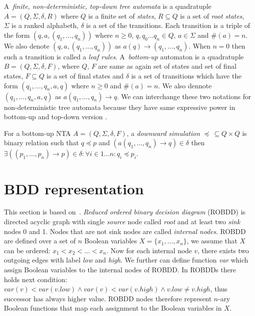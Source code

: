 \documentclass[a4paper, 12pt]{article}
\begin{document}
A~\emph{finite, non-deterministic, top-down tree automata} is a quadratuple $A=(Q, \Sigma, \delta, R)$ where
$Q$ is a finite set of \emph{states}, $R\subseteq Q$ is a set of \emph{root states}, $\Sigma$ is a ranked alphabeth,
$\delta$ is a set of the transitions.
Each transition is a triple of the form $(q,a,(q_1, \ldots, q_n))$ where $n \geq 0$, $q, q_0 \ldots q_n \in Q$, $a \in \Sigma$ and $\#(a) = n$.
We also denote $(q,a,(q_1, \ldots, q_n))$ as $a(q) \rightarrow (q_1, \ldots, q_n)$.
When $n = 0$ then such a transition is called a \emph{leaf rules}.
A~\emph{bottom-up} automaton is a quadratuple $B=(Q, \Sigma, \delta, F)$, where $Q$, $F$ are same as again set of states and set of final states, $F\subseteq Q$
is a set of final states and $\delta$ is a set of transitions which have the form $(q_1,\ldots, q_n,a,q)$ where $n \geq 0$ and $\#(a) = n$.
We also dennote $(q_1,\ldots, q_n,a,q)$ as $a(q_1, \ldots, q_n) \rightarrow q$.
We can interchange these two notations for non-deterministic tree automata because they have same expressive power in bottom-up and top-down version \cite{tata}.

For a bottom-up NTA $A=(Q, \Sigma, \delta, F)$, a \emph{downward simulation} $\preceq\, \subseteq Q\times Q$ is binary relation such that $q \preceq p$
and $(a(q_1,\ldots, q_n) \rightarrow q) \in \delta$ then $\exists ((p_1, \ldots, p_n) \rightarrow p) \in \delta: \forall i \in {1 \ldots n}: q_i \preceq p_i$.

\section{BDD representation}
\label{sec:bdd}

This section is based on~\cite{fiedor:wsks}. \textit{Reduced ordered binary decision diagram} (ROBDD) is directed acyclic graph with single \textit{source} node called \textit{root} and at least two \textit{sink} nodes 0 and 1. Nodes that are not sink nodes are called \textit{internal nodes}. ROBDD are defined over a set of $n$ Boolean variables $X = \{x_1, \dots, x_n\}$, we assume that $X$ can be ordered: $x_1 < x_2 < \dots < x_n$. Now for each internal node $v$, there exists two outgoing edges with label \textit{low} and \textit{high}. We further can define function \textit{var} which assign Boolean variables to the internal nodes of ROBDD. In ROBDDs there holds next condition: $var(v) < var(v.low) \wedge var(v) < var(v.high) \wedge v.low \neq v.high$, thus successor has always higher value. ROBDD nodes therefore represent $n$-ary Boolean functions that map each assignment to the Boolean variables in $X$.
\end{document}
